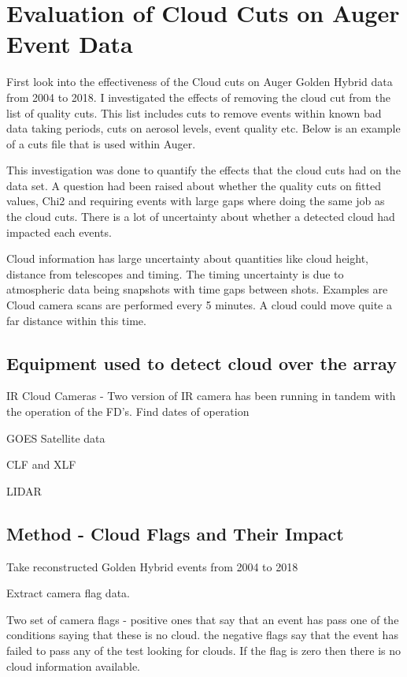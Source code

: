 \chapter[Evaluation of Cloud Cuts on Auger Event Data]{\centering Evaluation of Cloud Cuts on Auger Event Data \\}\label{Ch:CloudCuts}

First look into the effectiveness of the Cloud cuts on Auger Golden Hybrid data from 2004 to 2018.
I investigated the effects of removing the cloud cut from the list of quality cuts. This list includes cuts to remove events within known bad data taking periods, cuts on aerosol levels, event quality etc. Below is an example of a cuts file that is used within Auger.

This investigation was done to quantify the effects that the cloud cuts had on the data set. A question had been raised about whether the quality cuts on fitted values, Chi2 and requiring events with large gaps where doing the same job as the cloud cuts. There is a lot of uncertainty about whether a detected cloud had impacted each events.

Cloud information has large uncertainty about quantities like cloud height, distance from telescopes and timing. The timing uncertainty is due to atmospheric data being snapshots with time gaps between shots. Examples are Cloud camera scans are performed every 5 minutes. A cloud could move quite a far distance within this time.

\section{Equipment used to detect cloud over the array}

IR Cloud Cameras - Two version of IR camera has been running in tandem with the operation of the FD's. Find dates of operation

GOES Satellite data

CLF and XLF

LIDAR

\section{Method - Cloud Flags and Their Impact}

Take reconstructed Golden Hybrid events from 2004 to 2018 

Extract camera flag data.

Two set of camera flags - positive ones that say that an event has pass one of the conditions saying that these is no cloud. the negative flags say that the event has failed to pass any of the test looking for clouds. If the flag is zero then there is no cloud information available.

